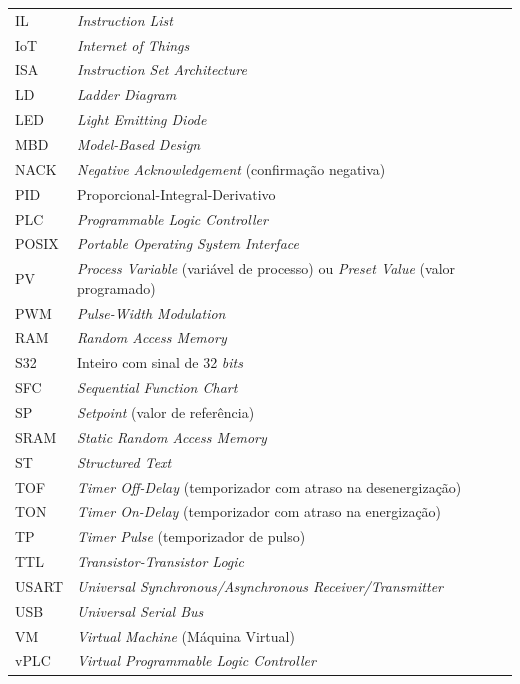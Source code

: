 \documentclass[portuguese,12pt,oneside,a4paper]{book}
\begin{document}
{\begin{longtable}{@{}l@{\hspace{1em}}p{12.6cm}@{}}
	IL		& \textit{Instruction List} \\
	IoT		& \textit{Internet of Things} \\
	ISA		& \textit{Instruction Set Architecture} \\
	LD		& \textit{Ladder Diagram} \\
	LED		& \textit{Light Emitting Diode} \\
	MBD		& \textit{Model-Based Design} \\
	NACK	& \textit{Negative Acknowledgement} (confirmação negativa) \\
	PID		& Proporcional-Integral-Derivativo \\
	PLC		& \textit{Programmable Logic Controller} \\
	POSIX	& \textit{Portable Operating System Interface} \\
	PV		& \textit{Process Variable} (variável de processo) ou \textit{Preset Value} (valor programado) \\
	PWM		& \textit{Pulse-Width Modulation} \\
	RAM		& \textit{Random Access Memory} \\
	S32		& Inteiro com sinal de 32 \textit{bits} \\
	SFC		& \textit{Sequential Function Chart} \\
	SP		& \textit{Setpoint} (valor de referência) \\
	SRAM	& \textit{Static Random Access Memory} \\
	ST		& \textit{Structured Text} \\
	TOF		& \textit{Timer Off-Delay} (temporizador com atraso na desenergização) \\
	TON		& \textit{Timer On-Delay} (temporizador com atraso na energização) \\
	TP		& \textit{Timer Pulse} (temporizador de pulso) \\
	TTL		& \textit{Transistor-Transistor Logic} \\
	USART	& \textit{Universal Synchronous/Asynchronous Receiver/Transmitter} \\
	USB		& \textit{Universal Serial Bus} \\
	VM		& \textit{Virtual Machine} (Máquina Virtual) \\
	vPLC	& \textit{Virtual Programmable Logic Controller} \\

\end{longtable}
}



\tableofcontents    %
\end{document}
